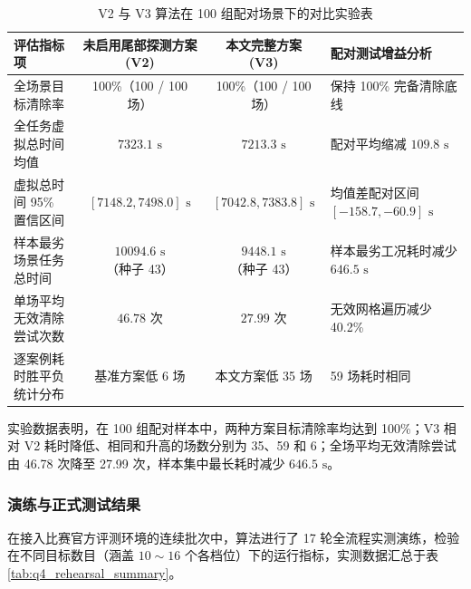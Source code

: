 \documentclass[zihao=-4,a4paper,UTF8]{ctexart}
\begin{document}
\begin{table}[htbp]
    \centering
    \footnotesize
    \vspace{-0.3em}
    \caption{V2 与 V3 算法在 100 组配对场景下的对比实验表}
    \label{tab:q4_ablation_results}
    \renewcommand{\arraystretch}{0.65}
    \setlength{\tabcolsep}{2.5pt}
    \begin{tabularx}{\linewidth}{l c c X}
        \toprule[1.5pt]
        \textbf{评估指标项} & \textbf{未启用尾部探测方案 (V2)} & \textbf{本文完整方案 (V3)} & \textbf{配对测试增益分析} \\
        \midrule
        全场景目标清除率 & 100\%（100 / 100 场） & 100\%（100 / 100 场） & 保持 100\% 完备清除底线 \\
        全任务虚拟总时间均值 & $7323.1\text{ s}$ & $7213.3\text{ s}$ & 配对平均缩减 $109.8\text{ s}$ \\
        虚拟总时间 95\% 置信区间 & $[7148.2, 7498.0]\text{ s}$ & $[7042.8, 7383.8]\text{ s}$ & 均值差配对区间 $[-158.7, -60.9]\text{ s}$ \\
        样本最劣场景任务总时间 & $10094.6\text{ s}$（种子 43） & $9448.1\text{ s}$（种子 43） & 样本最劣工况耗时减少 $646.5\text{ s}$ \\
        单场平均无效清除尝试次数 & $46.78\text{ 次}$ & $27.99\text{ 次}$ & 无效网格遍历减少 40.2\% \\
        逐案例耗时胜平负统计分布 & 基准方案低 6 场 & 本文方案低 35 场 & 59 场耗时相同 \\
        \bottomrule[1.5pt]
    \end{tabularx}
\end{table}

实验数据表明，在 100 组配对样本中，两种方案目标清除率均达到 100\%；V3 相对 V2 耗时降低、相同和升高的场数分别为 35、59 和 6；全场平均无效清除尝试由 46.78 次降至 27.99 次，样本集中最长耗时减少 $646.5\text{ s}$。

\subsubsection{演练与正式测试结果}

在接入比赛官方评测环境的连续批次中，算法进行了 17 轮全流程实测演练，检验在不同目标数目（涵盖 $10\sim 16$ 个各档位）下的运行指标，实测数据汇总于表 \ref{tab:q4_rehearsal_summary}。
\end{document}
